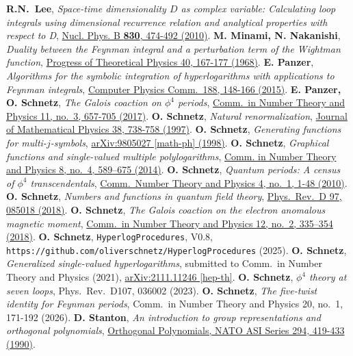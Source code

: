 \documentclass[oneside]{amsart}
\theoremstyle{plain}
\newcommand*{\doilink}[2]{\href{https://doi.org/\detokenize{#2}}{#1}}
\newcommand*{\arxivlink}[2]{\href{https://arxiv.org/abs/\detokenize{#2}}{#1}}
\begin{document}
\begin{thebibliography}{99}
 {\bf R.N.~Lee}, {\it Space-time dimensionality $D$ as complex variable: Calculating loop integrals using dimensional recurrence relation and analytical properties with respect to D}, \doilink{Nucl. Phys. B \textbf{830}, 474-492 (2010)}{doi:10.1016/j.nuclphysb.2009.12.025}.
 {\bf M. Minami, N. Nakanishi}, {\it Duality between the Feynman integral and a perturbation term of the Wightman function}, \doilink{Progress of Theoretical Physics 40, 167-177 (1968)}{10.1143/PTP.40.167}.
 {\bf E. Panzer}, {\it Algorithms for the symbolic integration of hyperlogarithms with applications to Feynman integrals}, \doilink{Computer Physics Comm.\ 188, 148-166 (2015)}{10.1016/j.cpc.2014.10.019}.
 {\bf E. Panzer, O. Schnetz}, {\it The Galois coaction on $\phi^4$ periods}, \doilink{Comm.\ in Number Theory and Physics 11, no.\ 3, 657-705 (2017)}{10.4310/CNTP.2017.v11.n3.a3}.
 {\bf O. Schnetz}, {\it Natural renormalization}, \doilink{Journal of Mathematical Physics 38, 738-758 (1997)}{10.1063/1.531900}.
 {\bf O. Schnetz}, {\it Generating functions for multi-$j$-symbols}, \href{https://arxiv.org/abs/math-ph/9805027}{arXiv:9805027 [math-ph] (1998)}.
 {\bf O. Schnetz}, {\it Graphical functions and single-valued multiple polylogarithms}, \doilink{Comm. in Number Theory and Physics 8, no.\ 4, 589–675 (2014)}{10.4310/CNTP.2014.v8.n4.a1}.
 {\bf O. Schnetz}, {\it Quantum periods: A census of $\phi^4$ transcendentals}, \doilink{Comm.\ Number Theory and Physics 4, no.\ 1, 1-48 (2010)}{10.4310/CNTP.2010.v4.n1.a1}.
 {\bf O. Schnetz}, {\it Numbers and functions in quantum field theory}, \doilink{Phys.\ Rev.\ D 97, 085018 (2018)}{10.1103/PhysRevD.97.085018}.
 {\bf O. Schnetz}, {\it The Galois coaction on the electron anomalous magnetic moment}, \doilink{Comm.\ in Number Theory and Physics 12, no.\ 2, 335–354 (2018)}{10.4310/CNTP.2018.v12.n2.a4}.
 {\bf O. Schnetz}, {\tt HyperlogProcedures}, V0.8, {\tt https://github.com/oliverschnetz/HyperlogProcedures} (2025).
 {\bf O. Schnetz}, {\it Generalized single-valued hyperlogarithms}, submitted to Comm.\ in Number Theory and Physics (2021), \arxivlink{arXiv:2111.11246 [hep-th]}{2111.11246}.
 {\bf O. Schnetz}, {\it $\phi^4$ theory at seven loops}, Phys.\ Rev.\ D107, 036002 (2023).
 {\bf O. Schnetz}, {\it The five-twist identity for Feynman periods}, Comm.\ in Number Theory and Physics 20, no.\ 1, 171-192 (2026).
 {\bf D. Stanton}, {\it An introduction to group representations and orthogonal polynomials}, \doilink{Orthogonal Polynomials, NATO ASI Series 294, 419-433 (1990)}{10.1007/978-94-009-0501-6_19}.

\end{thebibliography}
\end{document}

